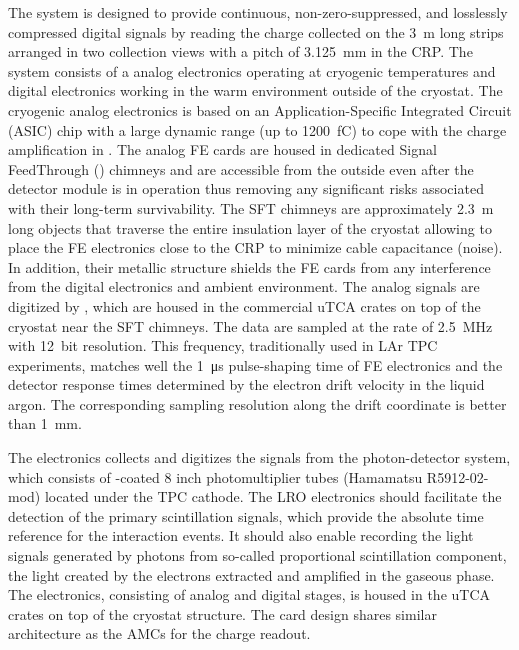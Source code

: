 The  system is designed to provide continuous, non-zero-suppressed, and losslessly compressed digital signals by reading the charge collected on the \SI{3}{m} long strips arranged in two collection views with a pitch of \SI{3.125}{mm} in the CRP. The system consists of a  analog electronics operating at cryogenic temperatures and digital electronics working in the warm environment outside of the cryostat.  The cryogenic  analog electronics is based on an Application-Specific Integrated Circuit (ASIC) chip with a large dynamic range (up to \SI{1200}{fC}) to cope with the charge amplification in . The analog FE cards are housed in dedicated Signal FeedThrough () chimneys and are accessible from the outside even after the detector module is in operation thus removing any significant risks associated with their long-term survivability. The SFT chimneys are approximately \SI{2.3}{m} long objects that traverse the entire insulation layer of the cryostat allowing to place the FE electronics close to the CRP to minimize cable capacitance (noise).  In addition, their metallic structure shields the FE cards from any interference from the digital electronics and ambient environment. The analog signals are digitized by , which are housed in the commercial uTCA crates on top of the cryostat near the SFT chimneys. The data are sampled at the rate of \SI{2.5}{MHz} with \SI{12}{bit} resolution.  This frequency, traditionally used in LAr TPC experiments, matches well the \SI{1}{\micro\second} pulse-shaping time of FE electronics and the detector response times determined by the electron drift velocity in the liquid argon. The corresponding sampling resolution along the drift coordinate is better than \SI{1}{\mm}. 

The  electronics collects and digitizes the signals from the photon-detector system, which consists of -coated \num{8} inch photomultiplier tubes (Hamamatsu R5912-02-mod) located under the TPC cathode. The LRO electronics should facilitate the detection of the primary scintillation signals, which provide the absolute time reference for the interaction events. It should also enable recording the light signals generated by photons from so-called proportional scintillation component, the light created by the electrons extracted and amplified in the gaseous phase. The electronics, consisting of analog and digital stages, is housed in the uTCA crates on top of the cryostat structure. The card design shares similar architecture as the AMCs for the charge readout. 

